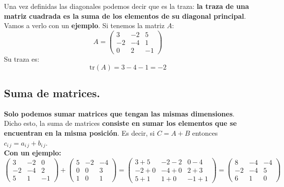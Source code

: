 \documentclass[a4paper,11pt,answers]{exam}
\begin{document}
Una vez definidas las diagonales podemos decir que es la traza: \textbf{la traza de una matriz cuadrada es la suma de los elementos de su diagonal principal}.\\
Vamos a verlo con un \textbf{ejemplo}. Si tenemos la matriz $A$:
\[A = \left(\begin{array}{rrr}
	3&-2& 5\\
	-2&-4&1\\
	0&2&-1
\end{array} \right)\]
Su traza es:
\[\mathrm{tr}(A) = 3-4-1 = -2\]

\subsection{Suma de matrices.}
\textbf{Solo podemos sumar matrices que tengan las mismas dimensiones}. Dicho esto, la suma de matrices \textbf{consiste en sumar los elementos que se encuentran en la misma posición}. Es decir, si $C = A+ B$ entonces $c_{i\,j} = a_{i\,j}+b_{i\,j}$.\\

\textbf{Con un ejemplo:}
\[\left(\begin{array}{rrr}
	3&-2& 0\\
	-2&-4&2\\
	5&1&-1
\end{array} \right) + \left(\begin{array}{rrr}
5&-2&-4\\
0& 0&3\\
1&0&1
\end{array}\right) = \left(\begin{array}{rrr}
3+5&-2-2&0-4\\
-2+0&-4 + 0&2 + 3\\
5 + 1&1+ 0& -1 + 1
\end{array}\right) = \left(\begin{array}{rrr}
8&-4&-4\\
-2&-4&5\\
6&1&0
\end{array}\right)\]

\end{document}
